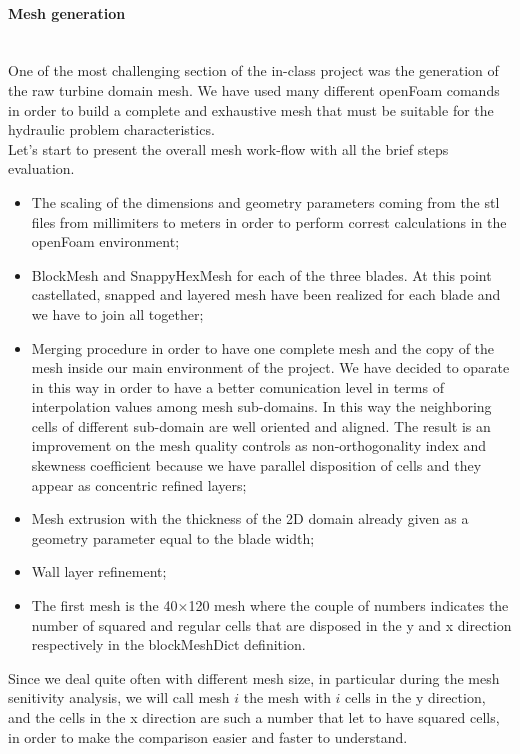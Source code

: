 \documentclass[a4paper,12pt]{article}
\begin{document}
\paragraph{Mesh generation}\mbox{}\\
One of the most challenging section of the in-class project was the generation of the raw turbine domain mesh. We have used many different openFoam comands in order to build a complete and exhaustive mesh that must be suitable for the hydraulic problem characteristics.
\\ 
Let's start to present the overall mesh work-flow with all the brief steps evaluation.
\\
\begin{itemize}
\item The scaling of the dimensions and geometry parameters coming from the stl files from millimiters to meters in order to perform correst calculations in the openFoam environment;

\item BlockMesh and SnappyHexMesh for each of the three blades. At this point castellated, snapped and layered mesh have been realized for each blade and we have to join all together;

\item Merging procedure in order to have one complete mesh and the copy of the mesh inside our main environment of the project. We have decided to oparate in this way in order to have a better comunication level in terms of interpolation values among mesh sub-domains. In this way the neighboring cells of different sub-domain are well oriented and aligned. The result is an improvement on the mesh quality controls as non-orthogonality index and skewness coefficient  because we have parallel disposition of cells and they appear as concentric refined layers;

\item Mesh extrusion with the thickness of the 2D domain already given as a geometry parameter equal to the blade width;

\item Wall layer refinement;

\item The first mesh is the 40$\times$120 mesh where the couple of numbers indicates the number of squared and regular cells that are disposed in the y and x direction respectively in the blockMeshDict definition.  
\end{itemize}

Since we deal quite often with different mesh size, in particular during the mesh senitivity analysis, we will call mesh $i$ the mesh with $i$ cells in the y direction, and the cells in the x direction are such a number that let to have squared cells, in order to make the comparison easier and faster to understand.
\end{document}
